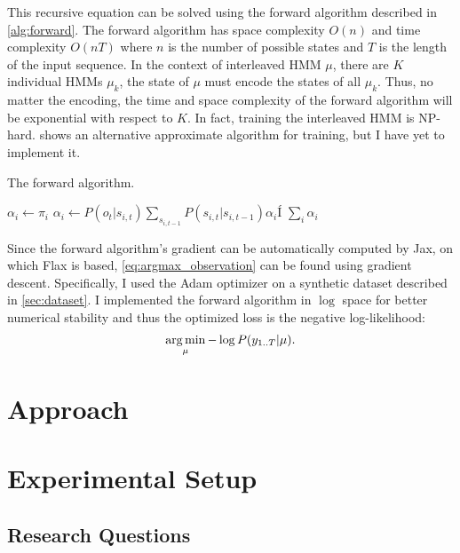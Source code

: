 This recursive equation can be solved using the forward algorithm described in \cref{alg:forward}. The forward algorithm has space complexity \(O(n)\)  and time complexity \(O(nT)\) where \(n\) is the number of possible states and \(T\) is the length of the input sequence. In the context of interleaved HMM \(\mu\), there are \(K\) individual HMMs \(\mu_k\), the state of \(\mu\) must encode the states of all \(\mu_k\). Thus, no matter the encoding, the time and space complexity of the forward algorithm will be exponential with respect to \(K\). In fact, training the interleaved HMM is NP-hard\cite{Landwehr2008-vw}. \citeauthor{Landwehr2008-vw} shows an alternative approximate algorithm for training, but I have yet to implement it.
\begin{algorithm}[H]
    \caption{The forward algorithm.}\label{alg:forward}
    \begin{algorithmic}[1]
        \State $\alpha_i \gets \pi_i$
        \EndFor
        \State $\alpha_i \gets P(o_t|s_{i,t}) \sum_{s_{i, t-1}} P(s_{i, t} | s_{i, t-1}) \alpha_i$Í
        \EndFor
        \EndFor
        \State \Return $\sum_{i} \alpha_i$
        \EndFunction
    \end{algorithmic}
\end{algorithm}

Since the forward algorithm's gradient can be automatically computed by Jax\cite{Bradbury2018-jz}, on which Flax is based, \cref{eq:argmax_observation} can be found using gradient descent. Specifically, I used the Adam\cite{Kingma2014-jj} optimizer on a synthetic dataset described in \cref{sec:dataset}. I implemented the forward algorithm in \(\log\) space for better numerical stability and thus the optimized loss is the negative log-likelihood:
\begin{equation}
    \label{eq:neg_log_likelihood}
    \operatorname*{arg\,min}_{\mu} - \log P(y_{1..T} | \mu).
\end{equation}

\section{Approach}

\section{Experimental Setup}

\subsection{Research Questions}

